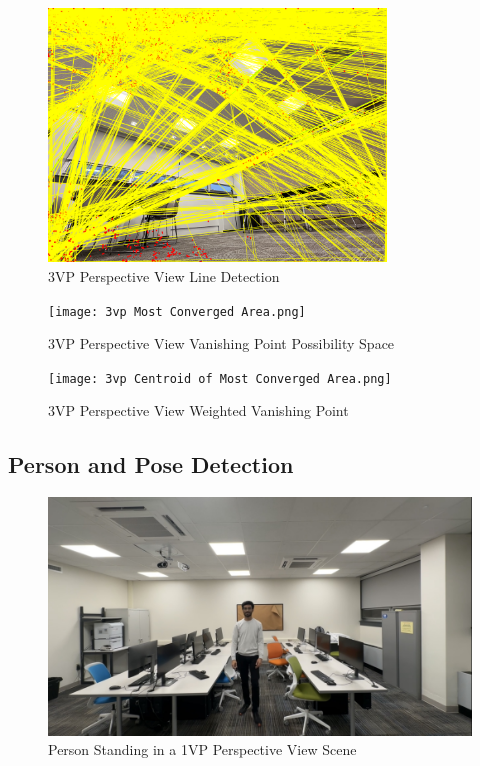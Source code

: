 \documentclass[12pt]{report}
\begin{document}
\begin{figure}[H]
    \centering
    \includegraphics[width=0.8\textwidth]{3vp Segmentation and Corner Detection Result.png}
    \caption{3VP Perspective View Line Detection}
    \label{fig: 3VP perspective view line detection}
\end{figure}

\begin{figure}[H]
    \centering
    \texttt{[image: 3vp Most Converged Area.png]}
    \caption{3VP Perspective View Vanishing Point Possibility Space}
    \label{fig: 3VP perspective view Vanishing point possibility space}
\end{figure}

\begin{figure}[H]
    \centering
    \texttt{[image: 3vp Centroid of Most Converged Area.png]}
    \caption{3VP Perspective View Weighted Vanishing Point}
    \label{fig: 3VP perspective view Weighted Vanishing Point}
\end{figure}

\subsection{Person and Pose Detection}

\begin{figure}[H]
    \centering
    \includegraphics[width=1.0\textwidth]{1vp person.jpg}
    \caption{Person Standing in a 1VP Perspective View Scene}
    \label{fig: Person standing in a 1VP perspective view Scene}
\end{figure}
\end{document}
